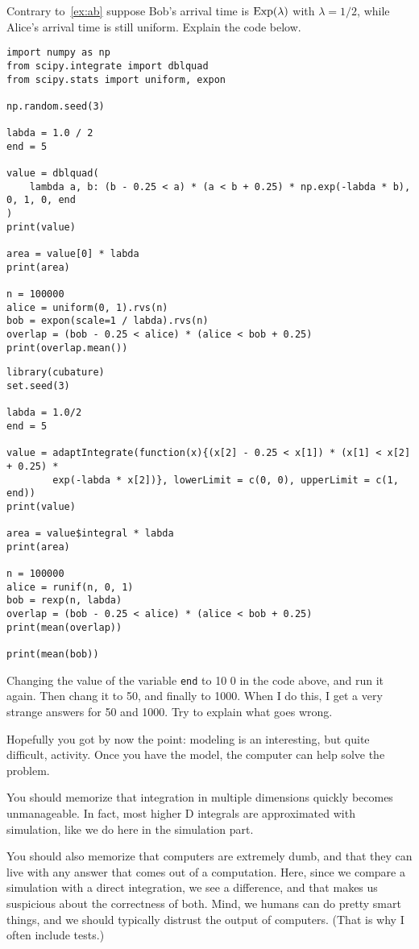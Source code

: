 \begin{exercise}
Contrary to~\cref{ex:ab} suppose Bob's arrival time is $\mathrm{Exp}(\lambda)$ with $\lambda=1/2$,  while Alice's arrival time is still uniform.
Explain the code below.
\begin{verbatim}
import numpy as np
from scipy.integrate import dblquad
from scipy.stats import uniform, expon

np.random.seed(3)

labda = 1.0 / 2
end = 5

value = dblquad(
    lambda a, b: (b - 0.25 < a) * (a < b + 0.25) * np.exp(-labda * b), 0, 1, 0, end
)
print(value)

area = value[0] * labda
print(area)

n = 100000
alice = uniform(0, 1).rvs(n)
bob = expon(scale=1 / labda).rvs(n)
overlap = (bob - 0.25 < alice) * (alice < bob + 0.25)
print(overlap.mean())
\end{verbatim}

\begin{verbatim}
library(cubature)   
set.seed(3)

labda = 1.0/2
end = 5

value = adaptIntegrate(function(x){(x[2] - 0.25 < x[1]) * (x[1] < x[2] + 0.25) *
		exp(-labda * x[2])}, lowerLimit = c(0, 0), upperLimit = c(1, end))
print(value)

area = value$integral * labda
print(area)

n = 100000
alice = runif(n, 0, 1)
bob = rexp(n, labda)
overlap = (bob - 0.25 < alice) * (alice < bob + 0.25)
print(mean(overlap))

print(mean(bob))
\end{verbatim}

\end{exercise}

\begin{exercise}
Changing the value of the variable \verb|end| to 10 0 in the code above, and run it again. Then chang  it to 50, and finally to 1000.  When I do this, I get a very strange answers for 50 and 1000. Try to explain what goes wrong.
\end{exercise}


Hopefully you got by now the point: modeling is an interesting, but  quite difficult, activity. Once you have the model, the computer can help solve the problem.


You should memorize that integration in multiple dimensions quickly becomes unmanageable. In fact, most higher D integrals are approximated with simulation, like we do here in the simulation part.

You should also memorize that computers are extremely dumb, and that they can live with any answer that comes out of a computation. Here, since we compare a simulation with a direct integration, we see a difference, and that makes us suspicious about the correctness of both. Mind, we humans can do pretty smart things, and we should typically distrust the output of computers. (That is why I often include tests.)
